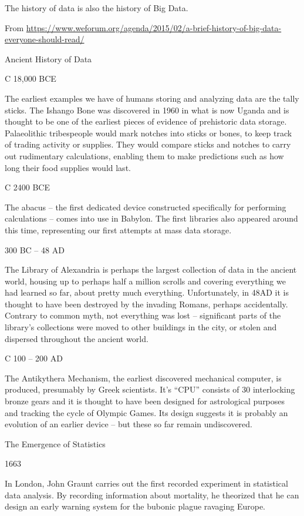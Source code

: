 \usepackage{hyperref}

The history of data is also the history of Big Data.  

From \url{https://www.weforum.org/agenda/2015/02/a-brief-history-of-big-data-everyone-should-read/}

Ancient History of Data

C 18,000 BCE

The earliest examples we have of humans storing and analyzing data are the tally sticks. The Ishango Bone was discovered in 1960 in what is now Uganda and is thought to be one of the earliest pieces of evidence of prehistoric data storage. Palaeolithic tribespeople would mark notches into sticks or bones, to keep track of trading activity or supplies. They would compare sticks and notches to carry out rudimentary calculations, enabling them to make predictions such as how long their food supplies would last.

C 2400 BCE

The abacus – the first dedicated device constructed specifically for performing calculations – comes into use in Babylon. The first libraries also appeared around this time, representing our first attempts at mass data storage.

300 BC – 48 AD

The Library of Alexandria is perhaps the largest collection of data in the ancient world, housing up to perhaps half a million scrolls and covering everything we had learned so far, about pretty much everything. Unfortunately, in 48AD it is thought to have been destroyed by the invading Romans, perhaps accidentally. Contrary to common myth, not everything was lost – significant parts of the library’s collections were moved to other buildings in the city, or stolen and dispersed throughout the ancient world.

C 100 – 200 AD

The Antikythera Mechanism, the earliest discovered mechanical computer, is produced, presumably by Greek scientists. It’s “CPU” consists of 30 interlocking bronze gears and it is thought to have been designed for astrological purposes and tracking the cycle of Olympic Games. Its design suggests it is probably an evolution of an earlier device – but these so far remain undiscovered.

The Emergence of Statistics

1663

In London, John Graunt carries out the first recorded experiment in statistical data analysis. By recording information about mortality, he theorized that he can design an early warning system for the bubonic plague ravaging Europe.

